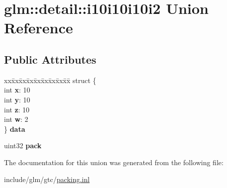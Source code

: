 \hypertarget{unionglm_1_1detail_1_1i10i10i10i2}{}\section{glm\+:\+:detail\+:\+:i10i10i10i2 Union Reference}
\label{unionglm_1_1detail_1_1i10i10i10i2}
\subsection*{Public Attributes}
\begin{DoxyCompactItemize}
\item 
\mbox{\label{unionglm_1_1detail_1_1i10i10i10i2_a425fea084366cd3c538f626e29cd63e0}} 
\begin{tabbing}
xx\=xx\=xx\=xx\=xx\=xx\=xx\=xx\=xx\=\kill
struct \{\\
\>int {\bfseries x}: 10\\
\>int {\bfseries y}: 10\\
\>int {\bfseries z}: 10\\
\>int {\bfseries w}: 2\\
\} {\bfseries data}\\

\end{tabbing}\item 
\mbox{\label{unionglm_1_1detail_1_1i10i10i10i2_a24e2dc324c86589d568dc330904c859a}} 
uint32 {\bfseries pack}
\end{DoxyCompactItemize}


The documentation for this union was generated from the following file\+:\begin{DoxyCompactItemize}
\item 
include/glm/gtc/\hyperlink{packing_8inl}{packing.\+inl}\end{DoxyCompactItemize}
